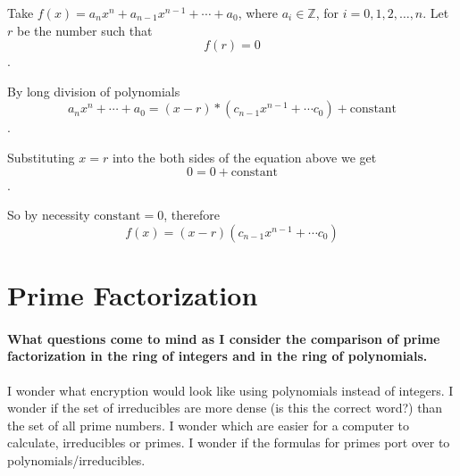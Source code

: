 \documentclass[12pt]{article}
\begin{document}
%

Take $f(x) = a_n x^n +a_{n-1} x^{n-1} + \cdots + a_0$, where $a_i \in \mathbb{Z}$, for $i=0, 1, 2, \ldots, n$.  Let $r$ be the number such that $$f(r) = 0$$.

By long division of polynomials
$$ a_n x^n + \cdots + a_0 = (x-r)*(c_{n-1} x^{n-1} + \cdots c_0) + \text{constant}$$.

Substituting $x=r$ into the both sides of the equation above we get
$$ 0 = 0 + \text{constant}$$.

So by necessity $\text{constant}=0$, therefore  $$ f(x) = (x-r)(c_{n-1} x^{n-1} + \cdots c_0)$$





\section*{Prime Factorization}
\paragraph*{What questions come to mind as I consider the comparison of prime factorization in the ring of integers and in the ring of polynomials.}
I wonder what encryption would look like using polynomials instead of integers.  I wonder if the set of irreducibles are more dense (is this the correct word?) than the set of all prime numbers.  I wonder which are easier for a computer to calculate, irreducibles or primes.  I wonder if the formulas for primes port over to polynomials/irreducibles.
\end{document}
